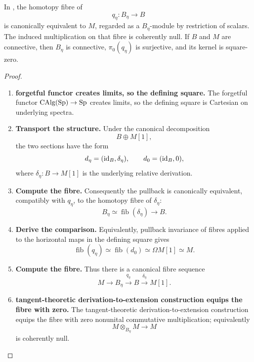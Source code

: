 \begin{proposition}
\label{prop:structured-square-zero-fibre}
In , the homotopy fibre of
\[
    q_\eta:B_\eta\longrightarrow B
\]
is canonically equivalent to \(M\), regarded as a \(B_\eta\)-module by
restriction of scalars. The induced multiplication on that fibre is
coherently null. If \(B\) and \(M\) are connective, then \(B_\eta\) is
connective, \(\pi_0(q_\eta)\) is surjective, and its kernel is square-zero.
\end{proposition}

\begin{proof}
\leavevmode
\begin{enumerate}[label=\textup{(\arabic*)}]
    \item \textbf{forgetful functor creates limits, so the defining square.}
    The forgetful functor \(\operatorname{CAlg}(\operatorname{Sp})\to\operatorname{Sp}\) creates limits, so the defining square is Cartesian on
    underlying spectra.

    \item \textbf{Transport the structure.}
    Under the canonical decomposition
    \[
        B\oplus M[1],
    \]
    the two sections have the form
    \[
        d_\eta=(\operatorname{id}_B,\delta_\eta),
        \qquad
        d_0=(\operatorname{id}_B,0),
    \]
    where \(\delta_\eta:B\to M[1]\) is the underlying relative derivation.

    \item \textbf{Compute the fibre.}
    Consequently the pullback is canonically equivalent, compatibly with \(q_\eta\), to the
    homotopy fibre of \(\delta_\eta\):
    \[
        B_\eta
        \simeq
        \operatorname{fib}(\delta_\eta)
        \longrightarrow B.
    \]

    \item \textbf{Derive the comparison.}
    Equivalently, pullback invariance of fibres applied to the horizontal maps in the defining
    square gives
    \[
        \operatorname{fib}(q_\eta)
        \simeq
        \operatorname{fib}(d_0)
        \simeq
        \Omega M[1]
        \simeq
        M.
    \]

    \item \textbf{Compute the fibre.}
    Thus there is a canonical fibre sequence
    \[
        M\longrightarrow B_\eta
        \xrightarrow{q_\eta}B
        \xrightarrow{\delta_\eta}M[1].
    \]

    \item \textbf{tangent-theoretic derivation-to-extension construction equips the fibre with zero.}
    The tangent-theoretic derivation-to-extension construction equips the fibre with zero
    nonunital commutative multiplication; equivalently
    \[
        M\otimes_{B_\eta}M\longrightarrow M
    \]
    is coherently null.


\end{enumerate}
\end{proof}
